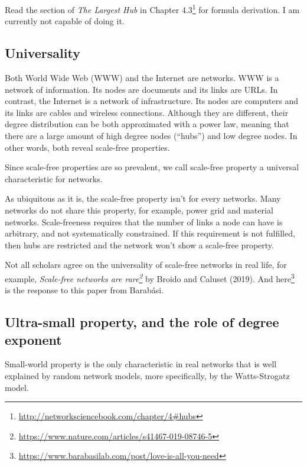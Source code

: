 \documentclass[
]{krantz}
\makeatletter
\renewcommand{\href}[2]{#2\footnote{\url{#1}}}
\newenvironment{kframe}{%
\medskip{}
\setlength{\fboxsep}{.8em}
 \def\at@end@of@kframe{}%
 \ifinner\ifhmode%
  \def\at@end@of@kframe{\end{minipage}}%
  \begin{minipage}{\columnwidth}%
 \fi\fi%
 \def\FrameCommand##1{\hskip\@totalleftmargin \hskip-\fboxsep
 \colorbox{shadecolor}{##1}\hskip-\fboxsep
     \hskip-\linewidth \hskip-\@totalleftmargin \hskip\columnwidth}%
 \MakeFramed {\advance\hsize-\width
   \@totalleftmargin\z@ \linewidth\hsize
   \@setminipage}}%
 {\par\unskip\endMakeFramed%
 \at@end@of@kframe}
\newenvironment{rmdblock}[1]
  {
  \begin{itemize}
  \renewcommand{\labelitemi}{
    \raisebox{-.7\height}[0pt][0pt]{
      {\setkeys{Gin}{width=3em,keepaspectratio}\texttt{[image: images/\#1]}}
    }
  }
  \setlength{\fboxsep}{1em}
  \begin{kframe}
  \item
  }
  {
  \end{kframe}
  \end{itemize}
  }
\newenvironment{rmdimportant}
  {\begin{rmdblock}{important}}
  {\end{rmdblock}}
\makeatother
\begin{document}
Read the section of \emph{The Largest Hub} in \href{http://networksciencebook.com/chapter/4\#hubs}{Chapter 4.3} for formula derivation. I am currently not capable of doing it.

\hypertarget{universality}{%
\subsection{Universality}\label{universality}}

Both World Wide Web (WWW) and the Internet are networks. WWW is a network of information. Its nodes are documents and its links are URLs. In contrast, the Internet is a network of infrastructure. Its nodes are computers and its links are cables and wireless connections. Although they are different, their degree distribution can be both approximated with a power law, meaning that there are a large amount of high degree nodes (``hubs'') and low degree nodes. In other words, both reveal scale-free properties.

Since scale-free properties are so prevalent, we call scale-free property a universal characteristic for networks.

As ubiquitous as it is, the scale-free property isn't for every networks. Many networks do not share this property, for example, power grid and material networks. Scale-freeness requires that the number of links a node can have is arbitrary, and not systematically constrained. If this requirement is not fulfilled, then hubs are restricted and the network won't show a scale-free property.

\begin{rmdimportant}
Not all scholars agree on the universality of scale-free networks in real life, for example, \emph{\href{https://www.nature.com/articles/s41467-019-08746-5}{Scale-free networks are rare}} by Broido and Caluset (2019). And \href{https://www.barabasilab.com/post/love-is-all-you-need}{here} is the response to this paper from Barabási.
\end{rmdimportant}

\hypertarget{ultra-small-property-and-the-role-of-degree-exponent}{%
\subsection{Ultra-small property, and the role of degree exponent}\label{ultra-small-property-and-the-role-of-degree-exponent}}

Small-world property is the only characteristic in real networks that is well explained by random network models, more specifically, by the Watts-Strogatz model.
\end{document}
